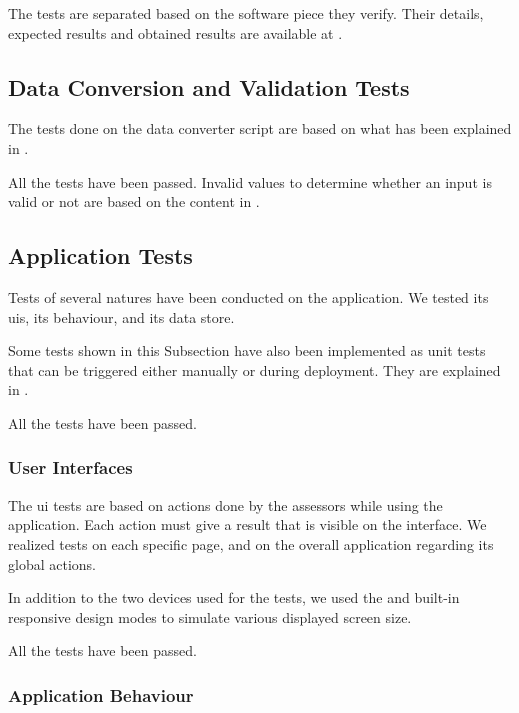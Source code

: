 The tests are separated based on the software piece they verify. Their details, expected results and obtained results are available at .

\subsection{Data Conversion and Validation Tests}
\label{subsec:app_tests_data}

The tests done on the data converter script are based on what has been explained in .

All the tests have been passed. Invalid values to determine whether an input is valid or not are based on the content in .

\subsection{Application Tests}
\label{subsec:app_tests_application}

Tests of several natures have been conducted on the application. We tested its \glspl{ui}, its behaviour, and its data store.

Some tests shown in this Subsection have also been implemented as unit tests that can be triggered either manually or during deployment. They are explained in .

All the tests have been passed.

\subsubsection{User Interfaces}
\label{subsubsec:app_tests_application_ui}

The \gls{ui} tests are based on actions done by the assessors while using the application. Each action must give a result that is visible on the interface. We realized tests on each specific page, and on the overall application regarding its global actions.

In addition to the two devices used for the tests, we used the  and  built-in responsive design modes to simulate various displayed screen size.

All the tests have been passed.

\subsubsection{Application Behaviour}
\label{subsubsec:app_tests_application_behaviour}

